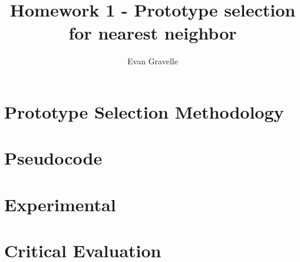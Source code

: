 \documentclass[letterpaper,10pt,onecolumn]{IEEEconf}
\begin{document}
\title{Homework 1 - Prototype selection for nearest neighbor}
\author{Evan Gravelle}
\maketitle

\section{Prototype Selection Methodology}

\section{Pseudocode}

\section{Experimental}

\section{Critical Evaluation}
\end{document}
